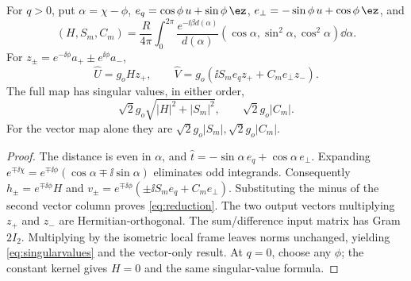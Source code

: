 \begin{theorem}\label{thm:reduction}
For $q>0$, put $\alpha=\chi-\phi$, $e_q=\cos\phi\,u+\sin\phi\,\ez$, $e_\perp=-\sin\phi\,u+\cos\phi\,\ez$, and
\begin{equation}\label{eq:moments}
 (H,S_m,C_m)=\frac R{4\pi}\int_0^{2\pi}\frac{e^{-\ii\beta d(\alpha)}}{d(\alpha)}
 (\cos\alpha,\sin^2\alpha,\cos^2\alpha)\dd\alpha.
\end{equation}
For $z_\pm=e^{-\ii\phi}a_+\pm e^{\ii\phi}a_-$,
\begin{equation}\label{eq:reduction}
 \widehat U=g_oHz_+,\qquad
 \widehat V=g_o(\ii S_me_qz_++C_me_\perp z_-).
\end{equation}
The full map has singular values, in either order,
\begin{equation}\label{eq:singularvalues}
 \sqrt2g_o\sqrt{|H|^2+|S_m|^2},\qquad \sqrt2g_o|C_m|.
\end{equation}
For the vector map alone they are $\sqrt2g_o|S_m|,\sqrt2g_o|C_m|$.
\end{theorem}
\begin{proof}
The distance is even in $\alpha$, and $\hat t=-\sin\alpha\,e_q+\cos\alpha\,e_\perp$. Expanding $e^{\mp\ii\chi}=e^{\mp\ii\phi}(\cos\alpha\mp\ii\sin\alpha)$ eliminates odd integrands. Consequently $h_\pm=e^{\mp\ii\phi}H$ and $v_\pm=e^{\mp\ii\phi}(\pm\ii S_me_q+C_me_\perp)$. Substituting the minus of the second vector column proves \eqref{eq:reduction}. The two output vectors multiplying $z_+$ and $z_-$ are Hermitian-orthogonal. The sum/difference input matrix has Gram $2I_2$. Multiplying by the isometric local frame leaves norms unchanged, yielding \eqref{eq:singularvalues} and the vector-only result. At $q=0$, choose any $\phi$; the constant kernel gives $H=0$ and the same singular-value formula.
\end{proof}

